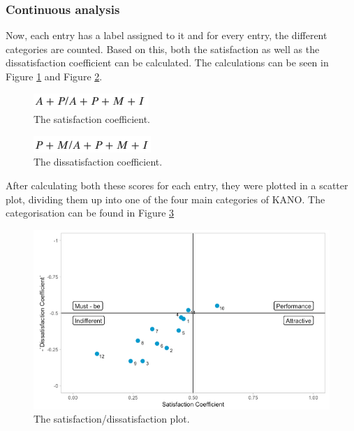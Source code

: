 \subsubsection{Continuous analysis}
Now, each entry has a label assigned to it and for every entry, the different categories are counted. Based on this, both the satisfaction as well as the dissatisfaction coefficient can be calculated. The calculations can be seen in Figure \ref{fig:satisfactionCoef} and Figure \ref{fig:dissatisfactionCoef}.
\begin{figure}[!htb]
	\centering
	\includegraphics{../LaTeX/Figures/Kano/SatisfactionCoef.png}
	\caption{The satisfaction coefficient.}
	\label{fig:satisfactionCoef}
\end{figure}
\begin{figure}[!htb]
	\centering
	\includegraphics{../LaTeX/Figures/Kano/DissatisfactionCoef.png}
	\caption{The dissatisfaction coefficient.}
	\label{fig:dissatisfactionCoef}
\end{figure}
\break
After calculating both these scores for each entry, they were plotted in  a scatter plot, dividing them up into one of the four main categories of KANO. The categorisation can be found in Figure \ref{fig:satisfactionPlot}
\begin{figure}[!htb]
	\centering
	\includegraphics[width=\linewidth, scale=0.7]{../LaTeX/Figures/Kano/SatisfactionPlot.png}
	\caption{The satisfaction/dissatisfaction plot.}
	\label{fig:satisfactionPlot}
\end{figure}

